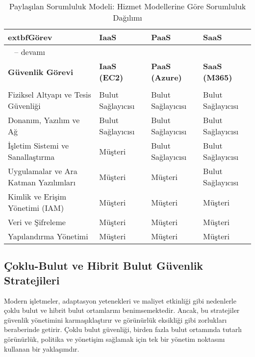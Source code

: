 \begin{longtable}{|>{\scriptsize}p{1.1cm}|>{\scriptsize}p{1cm}|>{\scriptsize}p{1cm}|>{\scriptsize}p{1cm}|}
\caption{Paylaşılan Sorumluluk Modeli: Hizmet Modellerine Göre Sorumluluk Dağılımı}
\label{tab:shared_responsibility_model}\\
\hline
	extbf{Görev} & \textbf{IaaS} & \textbf{PaaS} & \textbf{SaaS}\\
\hline
\endfirsthead
\multicolumn{4}{c}%
{\tablename\ \thetable{} -- devamı}\\
\hline
\textbf{Güvenlik Görevi} & \textbf{IaaS (EC2)} & \textbf{PaaS (Azure)} & \textbf{SaaS (M365)}\\
\hline
\endhead
\hline
\multicolumn{4}{|r|}{Devamı bir sonraki sayfada}\\
\hline
\endfoot
\hline
\endlastfoot
Fiziksel Altyapı ve Tesis Güvenliği & Bulut Sağlayıcısı & Bulut Sağlayıcısı & Bulut Sağlayıcısı \\
\hline
Donanım, Yazılım ve Ağ & Bulut Sağlayıcısı & Bulut Sağlayıcısı & Bulut Sağlayıcısı \\
\hline
İşletim Sistemi ve Sanallaştırma & Müşteri & Bulut Sağlayıcısı & Bulut Sağlayıcısı \\
\hline
Uygulamalar ve Ara Katman Yazılımları & Müşteri & Müşteri & Bulut Sağlayıcısı \\
\hline
Kimlik ve Erişim Yönetimi (IAM) & Müşteri & Müşteri & Müşteri \\
\hline
Veri ve Şifreleme & Müşteri & Müşteri & Müşteri \\
\hline
Yapılandırma Yönetimi & Müşteri & Müşteri & Müşteri \\
\hline
\end{longtable}

\subsection{Çoklu-Bulut ve Hibrit Bulut Güvenlik Stratejileri}

Modern işletmeler, adaptasyon yetenekleri ve maliyet etkinliği gibi nedenlerle çoklu bulut ve hibrit bulut ortamlarını benimsemektedir. Ancak, bu stratejiler güvenlik yönetimini karmaşıklaştırır ve görünürlük eksikliği gibi zorlukları beraberinde getirir. Çoklu bulut güvenliği, birden fazla bulut ortamında tutarlı görünürlük, politika ve yönetişim sağlamak için tek bir yönetim noktasını kullanan bir yaklaşımdır.

